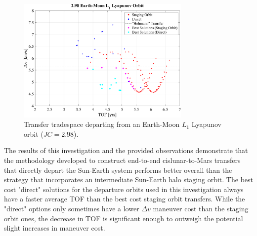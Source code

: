 \begin{figure}[ht]
    \centering
    \includegraphics[width=0.75\textwidth]{figures/TradeSpace_L1Lyapunov_2_98.pdf}
    \caption{Transfer tradespace departing from an Earth-Moon $L_{1}$ Lyapunov orbit ($JC=2.98$).}
    \label{fig:fewDirect}
\end{figure}

The results of this investigation and the provided observations demonstrate that the methodology
developed to construct end-to-end cislunar-to-Mars transfers that directly depart the Sun-Earth
system performs better overall than the strategy that incorporates an intermediate Sun-Earth halo
staging orbit. The best cost "direct" solutions for the departure orbits used in this investigation
always have a faster average TOF than the best cost staging orbit transfers. While the "direct"
options only sometimes have a lower $\Delta v$ maneuver cost than the staging orbit ones, the
decrease in TOF is significant enough to outweigh the potential slight increases in maneuver cost.
